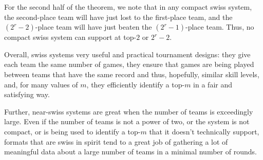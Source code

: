 {{        For the second half of the theorem, we note that in any compact swiss system, the second-place team will have just lost to the first-place team, and the $(2^r-2)$-place team will have just beaten the $(2^r-1)$-place team. Thus, no compact swiss system can support at top-$2 $ or $2^r-2.$
    }{}

    Overall, swiss systems very useful and practical tournament designs: they give each team the same number of games, they ensure that games are being played between teams that have the same record and thus, hopefully, similar skill levels, and, for many values of $m$, they efficiently identify a top-$m$ in a fair and satisfying way.

    Further, near-swiss systems are great when the number of teams is exceedingly large. Even if the number of teams is not a power of two, or the system is not compact, or is being used to identify a top-$m$ that it doesn't technically support, formats that are swiss in spirit tend to a great job of gathering a lot of meaningful data about a large number of teams in a minimal number of rounds.

}